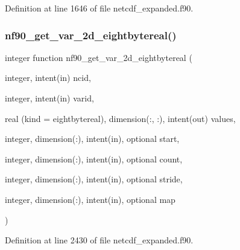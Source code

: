 Definition at line 1646 of file netcdf\+\_\+expanded.\+f90.

\mbox{\label{netcdf__expanded_8f90_a12e770f98fbe0667a092e830d92fcd08}} 
\subsubsection{\texorpdfstring{nf90\+\_\+get\+\_\+var\+\_\+2d\+\_\+eightbytereal()}{nf90\_get\_var\_2d\_eightbytereal()}}
{\footnotesize\ttfamily integer function nf90\+\_\+get\+\_\+var\+\_\+2d\+\_\+eightbytereal (\begin{DoxyParamCaption}\item[{integer, intent(in)}]{ncid,  }\item[{integer, intent(in)}]{varid,  }\item[{real (kind = eightbytereal), dimension(\+:, \+:), intent(out)}]{values,  }\item[{integer, dimension(\+:), intent(in), optional}]{start,  }\item[{integer, dimension(\+:), intent(in), optional}]{count,  }\item[{integer, dimension(\+:), intent(in), optional}]{stride,  }\item[{integer, dimension(\+:), intent(in), optional}]{map }\end{DoxyParamCaption})}



Definition at line 2430 of file netcdf\+\_\+expanded.\+f90.

\mbox{\label{netcdf__expanded_8f90_a2e9b41225f576c06a4e8c2b63f1b02f8}} 
